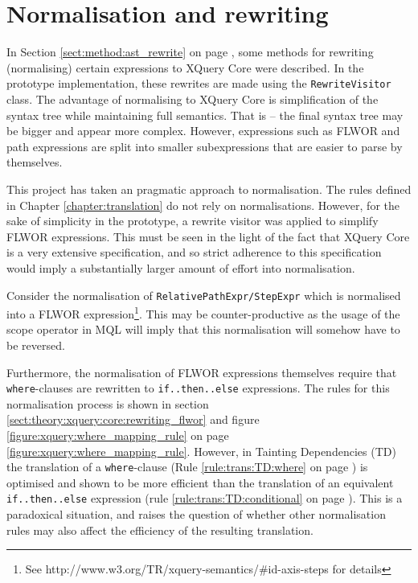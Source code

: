 \section{Normalisation and rewriting}
\label{sect:disc:rewriting}
In Section \ref{sect:method:ast_rewrite} on page
\pageref{sect:method:ast_rewrite}, some methods for rewriting (normalising)
certain expressions to XQuery Core were described. In the prototype implementation,
these rewrites are made using the \texttt{RewriteVisitor} class. The advantage
of normalising to XQuery Core is simplification of the syntax tree while
maintaining full semantics. That is -- the final syntax tree may be bigger and
appear more complex. However, expressions such as FLWOR and path expressions
are split into smaller subexpressions that are easier to parse by themselves. 

This project has taken an pragmatic approach to normalisation. The rules
defined in Chapter \ref{chapter:translation} do not rely on normalisations.
However, for the sake of simplicity in the prototype, a rewrite visitor was 
applied to simplify FLWOR expressions. This must be seen in the light of the
fact that XQuery Core is a very extensive specification\cite{xquery_semantics},
and so strict adherence to this specification would imply a substantially
larger amount of effort into normalisation.

Consider the normalisation of \texttt{RelativePathExpr/StepExpr} which is normalised
into a FLWOR expression\footnote{See
http://www.w3.org/TR/xquery-semantics/\#id-axis-steps for details}. This may be
counter-productive as the usage of the \textsf{scope} operator in MQL will
imply that this normalisation will somehow have to be reversed.

Furthermore, the normalisation of FLWOR expressions themselves require that
\texttt{where}-clauses are rewritten to \texttt{if..then..else} expressions. The rules for this
normalisation process is shown in section
\ref{sect:theory:xquery:core:rewriting_flwor} and figure
\ref{figure:xquery:where_mapping_rule} on page 
\ref{figure:xquery:where_mapping_rule}. However, in Tainting Dependencies
(TD) the translation of a \texttt{where}-clause (Rule \ref{rule:trans:TD:where} on page
\pageref{rule:trans:TD:where}) is optimised and shown to be more efficient than
the translation of an equivalent \texttt{if..then..else} expression (rule
\ref{rule:trans:TD:conditional} on page \pageref{rule:trans:TD:conditional}).
This is a paradoxical situation, and raises the question of whether other
normalisation rules may also affect the efficiency of the resulting
translation.

